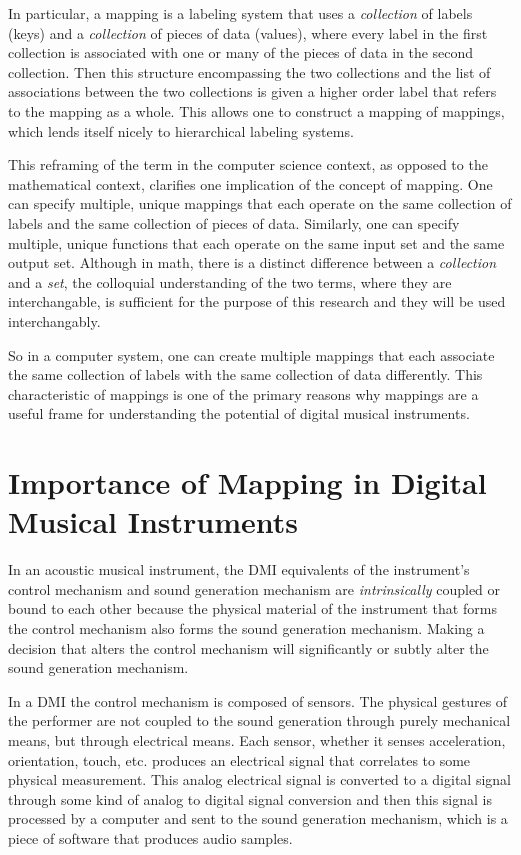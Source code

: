 In particular, a mapping is a labeling system that uses a \emph{collection} of labels (keys) and a \emph{collection} of pieces of data (values), where every label in the first collection is associated with one or many of the pieces of data in the second collection. Then this structure encompassing the two collections and the list of associations between the two collections is given a higher order label that refers to the mapping as a whole. This allows one to construct a mapping of mappings, which lends itself nicely to hierarchical labeling systems.

This reframing of the term in the computer science context, as opposed to the mathematical context, clarifies one implication of the concept of mapping. One can specify multiple, unique mappings that each operate on the same collection of labels and the same collection of pieces of data. Similarly, one can specify multiple, unique functions that each operate on the same input set and the same output set. Although in math, there is a distinct difference between a \emph{collection} and a \emph{set}, the colloquial understanding of the two terms, where they are interchangable, is sufficient for the purpose of this research and they will be used interchangably. 

So in a computer system, one can create multiple mappings that each associate the same collection of labels with the same collection of data differently. This characteristic of mappings is one of the primary reasons why mappings are a useful frame for understanding the potential of digital musical instruments. 

\section{Importance of Mapping in Digital Musical Instruments}

In an acoustic musical instrument, the DMI equivalents of the instrument's control mechanism and sound generation mechanism are \emph{intrinsically} coupled or bound to each other because the physical material of the instrument that forms the control mechanism also forms the sound generation mechanism. Making a decision that alters the control mechanism will significantly or subtly alter the sound generation mechanism.

In a DMI the control mechanism is composed of sensors. The physical gestures of the performer are not coupled to the sound generation through purely mechanical means, but through electrical means. Each sensor, whether it senses acceleration, orientation, touch, etc. produces an electrical signal that correlates to some physical measurement. This analog electrical signal is converted to a digital signal through some kind of analog to digital signal conversion and then this signal is processed by a computer and sent to the sound generation mechanism, which is a piece of software that produces audio samples.


